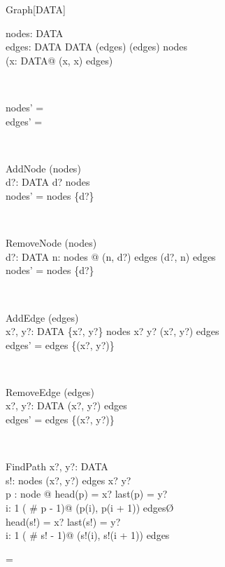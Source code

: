 \zedindent=2mm
\begin{class}{Graph}[DATA]
\also
\begin{state}
nodes:  \finset DATA \\ 
edges: DATA \rel DATA
\where
 \dom (edges) \cup  \ran (edges) \subseteq nodes \\ 
 \lnot (\exists x: DATA@ (x, x) \in edges)
\end{state}\\
\begin{init}
nodes' = \emptyset \\ 
edges' = \emptyset
\end{init} \\
\begin{schema}{AddNode}
\Delta(nodes)\\
d?: DATA 
\where
 d? \notin nodes \\ 
 nodes' = nodes \cup \{d?\} 
\end{schema} \\
\begin{schema}{RemoveNode}
\Delta (nodes)\\
d?: DATA 
\where
  \lnot \exists n: nodes @ (n, d?) \in edges \lor 
    (d?, n) \in edges\\ 
 nodes' = nodes \setminus \{d?\} 
\end{schema} \\
\begin{schema}{AddEdge}
\Delta (edges)\\
x?, y?: DATA 
\where
 \{x?, y?\} \subseteq nodes \land  x? \neq y? \land 
         (x?, y?) \notin edges \\ 
 edges' = edges \cup \{(x?, y?)\} 
\end{schema}\\
\begin{schema}{RemoveEdge}
\Delta (edges)\\
x?, y?: DATA 
\where
 (x?, y?) \in edges \\ 
 edges' = edges \setminus \{(x?, y?)\} \\ 
\end{schema} \\
\begin{schema}{FindPath}
x?, y?: DATA \\ 
s!:  \iseq nodes 
\where
 (x?, y?) \in edges \plus  \land x? \neq y? \land\\
       \exists p : \iseq node @ \M  head(p) = x? \land last(p) = y? \land\\
       \forall i: 1 \upto ( \# p - 1)@ (p(i), p(i + 1)) \in edges\O \\ 
 head(s!) = x? \land last(s!) = y?\\ 
\forall i: 1 \upto ( \# s! - 1)@ (s!(i), s!(i + 1)) \in edges 
\end{schema} 
\end{class} 
\zedindent=\leftmargini
